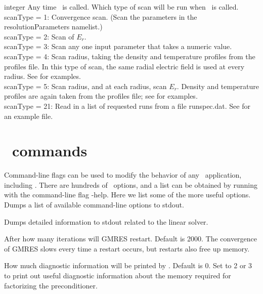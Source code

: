 {integer}
{Any time \sfincsScan~is called.}
{Which type of scan will be run when \sfincsScan~is called. \\

{\ttfamily scanType} = 1:  Convergence scan. (Scan the parameters in the resolutionParameters namelist.)\\

{\ttfamily scanType} = 2:  Scan of $E_r$.\\

{\ttfamily scanType} = 3:  Scan any one input parameter that takes a numeric value.\\

{\ttfamily scanType} = 4:  Scan radius, taking the density and temperature profiles from the {\ttfamily profiles} file.
In this type of scan, the same radial electric field is used at every radius.
See  for examples.\\

{\ttfamily scanType} = 5:  Scan radius, and at each radius, scan $E_r$.  Density and temperature profiles are again
 taken from the {\ttfamily profiles} file; see  for examples.\\

{\ttfamily scanType} = 21: Read in a list of requested runs from a file {\ttfamily runspec.dat}. See  for an example file.
}









\section{\PETSc~commands}

Command-line flags can be used to modify the behavior of any \PETSc~application, including \sfincs.
There are hundreds of \PETSc~options, and a list can be obtained by running with the command-line flag
{\ttfamily -help}. Here we list some of the more useful options.\\

{Dumps a list of available command-line options to stdout.}

\myhrule

{Dumps detailed information to stdout related to the linear solver.}

\myhrule

{After how many iterations will GMRES restart. Default is 2000. The convergence of GMRES slows every time a restart occurs, but restarts also free up memory.}

\myhrule

{How much diagnostic information will be printed by \mumps. Default is 0. Set to 2 or 3 to print out useful diagnostic information about the memory required for factorizing the preconditioner.}


